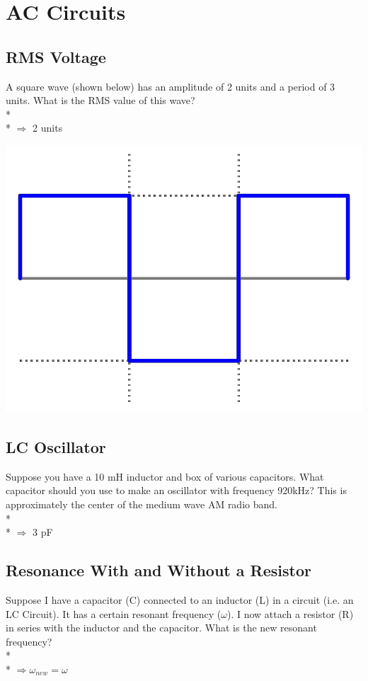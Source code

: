 \documentclass[11pt]{article}
\begin{document}

\pagebreak
\section{AC Circuits}
\vspace{10pt}

\subsection{RMS Voltage}
A square wave (shown below) has an amplitude of 2 units and a period of 3 units.  What is the RMS value of this wave? \\* \\*
$\Rightarrow$ 2 units

\begin{center}
\includegraphics[scale=0.15]{Images/square_wave.png}
\end{center}

\subsection{LC Oscillator}
Suppose you have a 10 mH inductor and box of various capacitors.  What capacitor should you use to make an oscillator with frequency 920kHz?  This is approximately the center of the medium wave AM radio band.\\* \\*
$\Rightarrow$ 3 pF

\subsection{Resonance With and Without a Resistor}
Suppose I have a capacitor (C) connected to an inductor (L) in a circuit (i.e. an LC Circuit).  It has a certain resonant frequency ($\omega$).  I now attach a resistor (R) in series with the inductor and the capacitor.  What is the new resonant frequency? \\* \\*
$\Rightarrow \omega_{new} = \omega$
\end{document}
